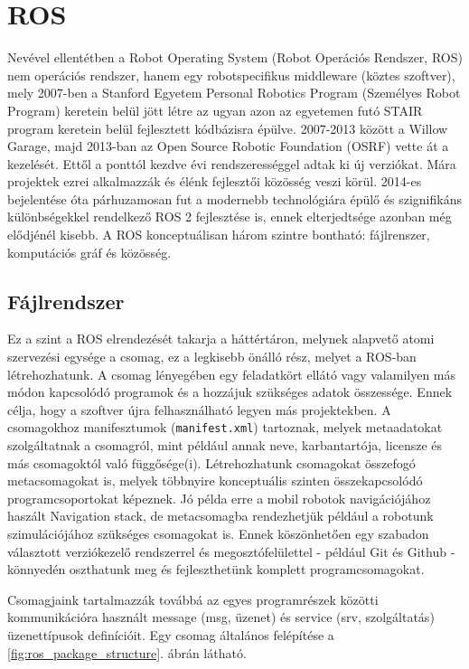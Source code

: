 \section{ROS}
Nevével ellentétben a Robot Operating System (Robot Operációs Rendszer, ROS) nem operációs rendszer, hanem egy robotspecifikus middleware (köztes szoftver), mely 2007-ben a Stanford Egyetem Personal Robotics Program (Személyes Robot Program)\cite{noauthor_stanford_nodate} keretein belül jött létre az ugyan azon az egyetemen futó STAIR\cite{noauthor_stair_nodate} program keretein belül fejlesztett kódbázisra épülve. 2007-2013 között a Willow Garage, majd 2013-ban az Open Source Robotic Foundation (OSRF)\cite{noauthor_open_nodate} vette át a kezelését. Ettől a ponttól kezdve évi rendszerességgel adtak ki új verziókat. Mára projektek ezrei alkalmazzák és élénk fejlesztői közösség veszi körül. 2014-es bejelentése óta párhuzamosan fut a modernebb technológiára épülő és szignifikáns különbségekkel rendelkező ROS 2 fejlesztése is, ennek elterjedtsége azonban még elődjénél kisebb. A ROS konceptuálisan három szintre bontható: fájlrenszer, komputációs gráf és közösség.

\subsection{Fájlrendszer}
Ez a szint a ROS elrendezését takarja a háttértáron, melynek alapvető atomi szervezési egysége a csomag, ez a legkisebb önálló rész, melyet a ROS-ban létrehozhatunk. A csomag lényegében egy feladatkört ellátó vagy valamilyen más módon kapcsolódó programok és a hozzájuk szükséges adatok összessége. Ennek célja, hogy a szoftver újra felhasználható legyen más projektekben. A csomagokhoz manifesztumok (\lstinline{manifest.xml}) tartoznak, melyek metaadatokat szolgáltatnak a csomagról, mint például annak neve, karbantartója, licensze és más csomagoktól való függősége(i). Létrehozhatunk csomagokat összefogó metacsomagokat is, melyek többnyire konceptuális szinten összekapcsolódó programcsoportokat képeznek. Jó példa erre a mobil robotok navigációjához haszált Navigation stack\cite{noauthor_navigation_nodate}, de metacsomagba rendezhetjük például a robotunk szimulációjához szükséges csomagokat is. Ennek köszönhetően egy szabadon választott verziókezelő rendszerrel és megosztófelülettel - például Git\cite{noauthor_git_nodate} és Github\cite{noauthor_github_nodate} - könnyedén oszthatunk meg és fejleszthetünk komplett programcsomagokat.

Csomagjaink tartalmazzák továbbá az egyes programrészek közötti kommunikációra használt message (msg, üzenet) és service (srv, szolgáltatás) üzenettípusok definícióit. Egy csomag általános felépítése a \ref{fig:ros_package_structure}. ábrán látható.

